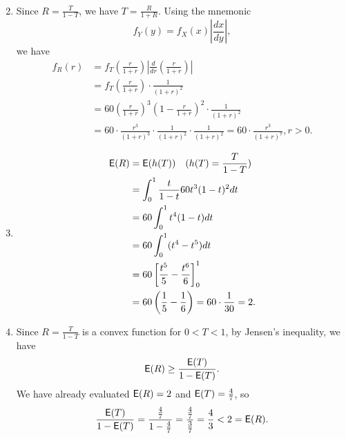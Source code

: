 \documentclass[12pt]{article}
\newcommand{\E}{{\sf E}}
\newenvironment{problem}[2][Problem]{\begin{trivlist}
\item[\hskip \labelsep {\bfseries #1}\hskip \labelsep {\bfseries #2.}]}
{\end{trivlist}}
\begin{document}
\begin{problem}{5}
\begin{enumerate}
\[\begin{aligned}
      \end{aligned}
    \]
    \item Since $R = \frac{T}{1-T}$, we have $T = \frac{R}{1+R}$.
    Using the mnemonic \[
      f_Y(y) = f_X(x) \left| \frac{dx}{dy} \right|,
    \]
    we have
    \[
      \begin{aligned}
        f_R(r) &= f_T\left(\frac{r}{1+r}\right) \left| \frac{d}{dr}
        \left(\frac{r}{1+r}\right) \right| \\
        &= f_T\left(\frac{r}{1+r}\right) \cdot \frac{1}{(1+r)^2} \\
        &= 60 \left(\frac{r}{1+r}\right)^3 
        \left(1 - \frac{r}{1+r}\right)^2 \cdot \frac{1}{(1+r)^2} \\
        &= 60 \cdot \frac{r^3}{(1+r)^3} \cdot \frac{1}{(1+r)^2} 
        \cdot \frac{1}{(1+r)^2} = 60 \cdot \frac{r^3}{(1+r)^7}, 
        r > 0.
      \end{aligned}
    \]
    \item
    \[
      \begin{aligned}
        \E(R) &= \E(h(T)) \quad (h(T) = \frac{T}{1-T}) \\
        &= \int_{0}^{1} \frac{t}{1-t} 60t^3(1-t)^2 dt \\
        &= 60 \int_{0}^{1} t^4 (1-t) dt \\
        &= 60 \int_{0}^{1} (t^4 - t^5) dt \\
        &= 60 \left[ \frac{t^5}{5} - \frac{t^6}{6} \right]_{0}^{1} \\
        &= 60 \left( \frac15 - \frac16 \right) = 60 \cdot \frac{1}{30} = 2.
      \end{aligned}
    \]
    \item Since $R = \frac{T}{1-T}$ is a convex function for $0 < T < 1$,
    by Jensen's inequality, we have
    \[
      \E(R) \ge \frac{\E(T)}{1-\E(T)}.
    \]
    We have already evaluated $\E(R) = 2$ and $\E(T) = \frac{4}{7}$, so
    \[
      \frac{\E(T)}{1-\E(T)} = \frac{\frac{4}{7}}{1-\frac{4}{7}} 
      = \frac{\frac{4}{7}}{\frac{3}{7}} = \frac{4}{3} < 2 = \E(R).
    \]
  \end{enumerate}

\end{problem}
\end{document}
